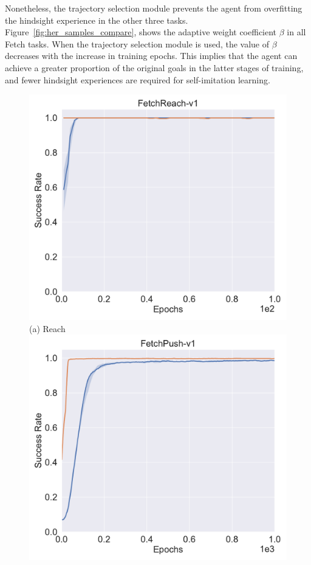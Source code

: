 Nonetheless, the trajectory selection module prevents the agent from overfitting the hindsight experience in the other three tasks. Figure~\ref{fig:her_samples_compare}, shows the adaptive weight coefficient $\beta$ in all Fetch tasks. When the trajectory selection module is used, the value of $\beta$ decreases with the increase in training epochs. This implies that the agent can achieve a greater proportion of the original goals in the latter stages of training, and fewer hindsight experiences are required for self-imitation learning.
\begin{figure}[h!]
  \centering
  \includegraphics[width=\linewidth]{figures/chapter3/reach_her.pdf}
  ({a}) Reach
\endminipage
{}%
  \centering
  \includegraphics[width=\linewidth]{figures/chapter3/push_her.pdf}

\end{figure}
